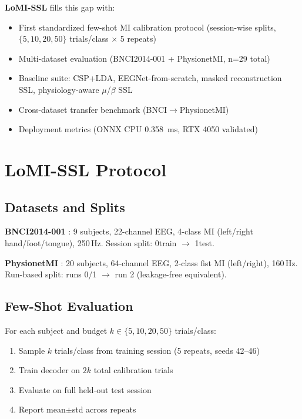 \documentclass{iopjournal}
\begin{document}
\textbf{LoMI-SSL} fills this gap with:
\begin{itemize}
\item First standardized few-shot MI calibration protocol (session-wise splits, $\{5,10,20,50\}$ trials/class $\times$ 5 repeats)
\item Multi-dataset evaluation (BNCI2014-001 + PhysionetMI, n=29 total)
\item Baseline suite: CSP+LDA, EEGNet-from-scratch, masked reconstruction SSL, physiology-aware $\mu$/$\beta$ SSL
\item Cross-dataset transfer benchmark (BNCI$\rightarrow$PhysionetMI)
\item Deployment metrics (ONNX CPU \SI{0.358}{\milli\second}, RTX 4050 validated)
\end{itemize}

\section{LoMI-SSL Protocol}

\subsection{Datasets and Splits}

\textbf{BNCI2014-001} \cite{tangermann2012benchmark}: 9 subjects, 22-channel EEG, 4-class MI (left/right hand/foot/tongue), 250\,Hz. Session split: 0train $\rightarrow$ 1test.

\textbf{PhysionetMI} \cite{goldberger2000physiobank}: 20 subjects, 64-channel EEG, 2-class fist MI (left/right), 160\,Hz. Run-based split: runs 0/1 $\rightarrow$ run 2 (leakage-free equivalent).

\subsection{Few-Shot Evaluation}

For each subject and budget $k \in \{5,10,20,50\}$ trials/class:
\begin{enumerate}
\item Sample $k$ trials/class from training session (5 repeats, seeds 42--46)
\item Train decoder on $2k$ total calibration trials
\item Evaluate on full held-out test session
\item Report mean$\pm$std across repeats
\end{enumerate}
\end{document}
